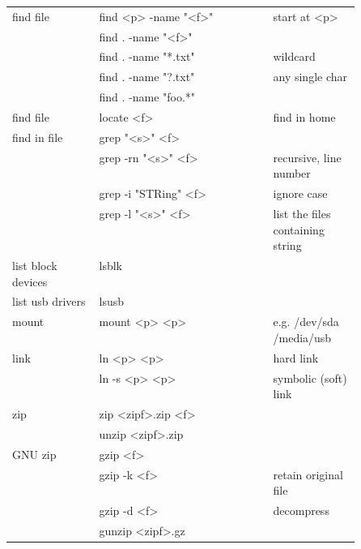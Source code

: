 {\begin{tabularx}{\linewidth}{@{} p{0.25\linewidth}>{\ttfamily}lp{0.25\linewidth} @{}}
        find file            & find <p> -name "<f>"       & start at <p>                     \\ %
                             & find . -name "<f>"         &                                  \\ %
                             & find . -name "*.txt"       & wildcard                         \\ %
                             & find . -name "?.txt"       & any single char                  \\ %
                             & find . -name "foo.*"       &                                  \\ %
        find file            & locate <f>                 & find in home                     \\ %
        find in file         & grep "<s>" <f>             &                                  \\ %
                             & grep -rn "<s>" <f>         & recursive, line number           \\ %
                             & grep -i "STRing" <f>       & ignore case                      \\ %
                             & grep -l "<s>" <f>          & list the files containing string \\ %
        list block devices   & lsblk                      &                                  \\
        list usb drivers     & lsusb                      &                                  \\
        mount                & mount <p> <p>              & e.g. /dev/sda /media/usb         \\
        link                 & ln <p> <p>                 & hard link                        \\
                             & ln -s <p> <p>              & symbolic (soft) link             \\
        zip                  & zip <zipf>.zip <f>         &                                  \\
                             & unzip <zipf>.zip           &                                  \\
        GNU zip              & gzip <f>                   &                                  \\
                             & gzip -k <f>                & retain original file             \\
                             & gzip -d <f>                & decompress                       \\
                             & gunzip <zipf>.gz           &                                  \\
    \end{tabularx}

}
